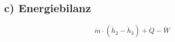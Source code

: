 \subsection*{c) Energiebilanz}

\begin{equation}
\dot{m} \cdot \left( \dot{h}_{2} - \dot{h}_{3} \right) + \dot{Q} - \dot{W}
\end{equation}